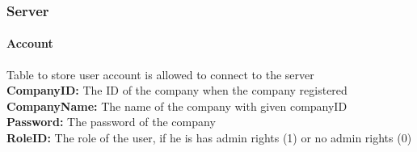 \documentclass[a4paper, 11pt]{article}
\begin{document}
\subsubsection*{Server}

\noindent
{}

\paragraph*{Account}
Table to store user account is allowed to connect to the server
 \\
\textbf{CompanyID:} The ID of the company when the company registered
 \\
\textbf{CompanyName:} The name of the company with given companyID
 \\
\textbf{Password:} The password of the company
 \\
\textbf{RoleID:} The role of the user, if he is has admin rights (1) or no admin rights (0)
 
\end{document}
